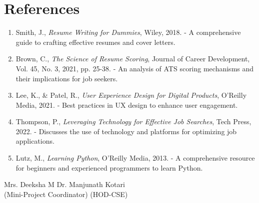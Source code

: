 \documentclass[12pt,a4paper]{report}
\begin{document}
\chapter{References}
\begin{enumerate}
    \item Smith, J., \textit{Resume Writing for Dummies}, Wiley, 2018. - A comprehensive guide to crafting effective resumes and cover letters.
    \item Brown, C., \textit{The Science of Resume Scoring}, Journal of Career Development, Vol. 45, No. 3, 2021, pp. 25-38. - An analysis of ATS scoring mechanisms and their implications for job seekers.
    \item Lee, K., \& Patel, R., \textit{User Experience Design for Digital Products}, O'Reilly Media, 2021. - Best practices in UX design to enhance user engagement.
    \item Thompson, P., \textit{Leveraging Technology for Effective Job Searches}, Tech Press, 2022. - Discusses the use of technology and platforms for optimizing job applications.
    \item Lutz, M., \textit{Learning Python}, O'Reilly Media, 2013. - A comprehensive resource for beginners and experienced programmers to learn Python.
\end{enumerate}


\vfill
\noindent Mrs. Deeksha M \hfill Dr. Manjunath Kotari \\
(Mini-Project Coordinator) \hfill (HOD-CSE)
\end{document}
